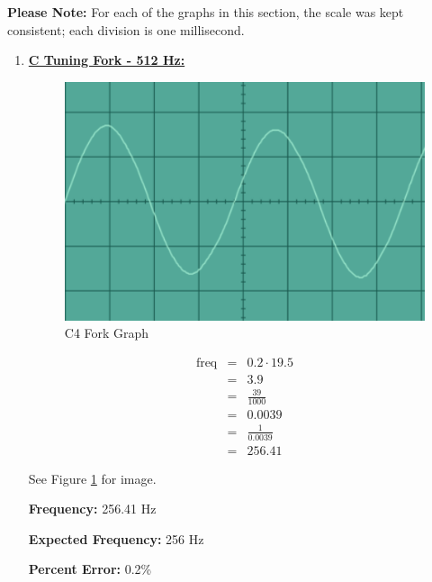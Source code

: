 \documentclass[12pt,oneside]{article}
\begin{document}
\textbf{Please Note:} For each of the graphs in this section, the scale
was kept consistent; each division is one millisecond.

\begin{enumerate}
\item \underline{\bf C Tuning Fork - 512 Hz:}

\color{red}

\begin{figure}[H]

{\centering \includegraphics[width=15cm,]{./images/c4} 

}

\caption{C4 Fork Graph}\label{fig:c4}
\end{figure}

\begin{eqnarray}
\text{freq} & = & 0.2 \cdot 19.5 \\
            & = & 3.9 \\
            & = & \frac{39}{1000} \\
            & = & 0.0039 \\
            & = & \frac{1}{0.0039} \\
            & = & 256.41
\end{eqnarray}

See Figure \ref{fig:c4} for image.

\textbf{Frequency:} 256.41 Hz

\par

\textbf{Expected Frequency:} 256 Hz

\par

\textbf{Percent Error: } 0.2\%


\end{enumerate}
\end{document}
